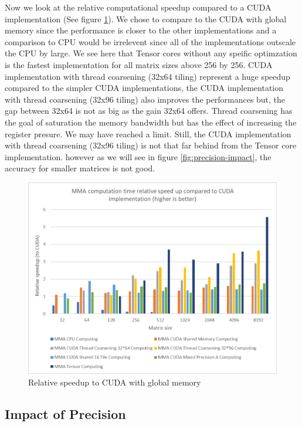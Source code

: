 \documentclass[conference]{IEEEtran}
\begin{document}
  Now we look at the relative computational speedup compared to a CUDA implementation (See figure \ref{fig:performance-comparison}).
  We chose to compare to the CUDA with global memory since the performance is closer to 
  the other implementations and a comparison to CPU would be irrelevent since all of the implementations
  outscale the CPU by large. We see here that Tensor cores without any speific optimzation is the fastest
  implementation for all matrix sizes above 256 by 256. CUDA implementation with thread coarsening (32x64 tiling) represent a huge
  speedup compared to the simpler CUDA implementations, the CUDA implementation with thread coarsening (32x96 tiling) also improves
  the performances but, the gap between 32x64 is not as big as the gain 32x64 offers. Thread coarsening has the goal
  of saturation the memory bandwidth but has the effect of increasing the register presure. We may have reached a limit.
  Still, the CUDA implementation with thread coarsening (32x96 tiling) is not that far behind from the Tensor core implementation.
  however as we will see in figure \ref{fig:precision-impact}, the accuracy for smaller matrices is not good.

  \begin{figure}[h]
    \centering
    \includegraphics[scale=0.53]{figures/relative_speedup_2.png}
    \caption{Relative speedup to CUDA with global memory}
    \label{fig:performance-comparison}
  \end{figure}
  
  
  
  \subsection{Impact of Precision}\label{sec:impact-precision}
  
\end{document}
